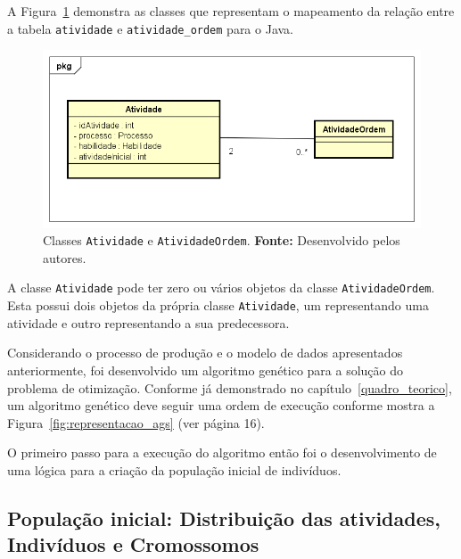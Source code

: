 \par A Figura~\ref{fig:class_atividadeOrdem} demonstra as classes que representam o mapeamento da relação
entre a tabela \texttt{atividade} e \texttt{atividade\_ordem} para o Java.

\newpage

\begin{figure}[h!]
	\centerline{\includegraphics[scale=0.7]{./imagens/atividade_diagram.png}}
	\caption[Classes \texttt{Atividade} e \texttt{AtividadeOrdem}.]
	{Classes \texttt{Atividade} e \texttt{AtividadeOrdem}. \textbf{Fonte:}
	Desenvolvido pelos autores.}
	\label{fig:class_atividadeOrdem}
\end{figure} 

\par A classe \texttt{Atividade} pode ter zero ou vários objetos da classe
\texttt{AtividadeOrdem}.
Esta possui dois objetos da própria classe \texttt{Atividade}, um representando uma
atividade e outro representando a sua predecessora.

\par Considerando o processo de produção e o modelo de dados apresentados anteriormente, foi
desenvolvido um algoritmo genético para a solução do problema de otimização. Conforme já demonstrado 
no capítulo~\ref{quadro_teorico}, um algoritmo genético deve seguir uma ordem de execução conforme mostra
a Figura~\ref{fig:representacao_ags} (ver página 16).

\par O primeiro passo para a execução do algoritmo então foi o desenvolvimento de uma lógica para a criação
da população inicial de indivíduos.

\subsection {População inicial: Distribuição das atividades, Indivíduos e Cromossomos} \label{populacao_inicial_section}


